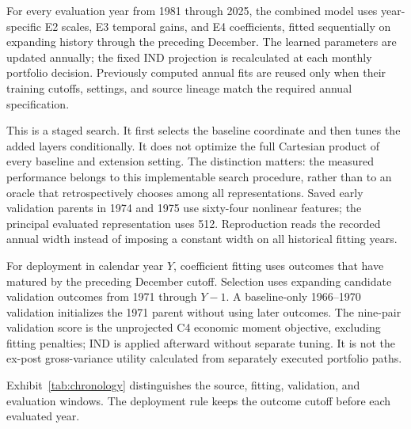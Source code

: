 \documentclass[12pt,letterpaper,fleqn]{article}
\begin{document}
For every evaluation year from 1981 through 2025, the combined model uses year-specific E2 scales, E3 temporal gains, and E4 coefficients, fitted sequentially on expanding history through the preceding December. The learned parameters are updated annually; the fixed IND projection is recalculated at each monthly portfolio decision. Previously computed annual fits are reused only when their training cutoffs, settings, and source lineage match the required annual specification.

This is a staged search. It first selects the baseline coordinate and then tunes the added layers conditionally. It does not optimize the full Cartesian product of every baseline and extension setting. The distinction matters: the measured performance belongs to this implementable search procedure, rather than to an oracle that retrospectively chooses among all representations. Saved early validation parents in 1974 and 1975 use sixty-four nonlinear features; the principal evaluated representation uses 512. Reproduction reads the recorded annual width instead of imposing a constant width on all historical fitting years.

For deployment in calendar year $Y$, coefficient fitting uses outcomes that have matured by the preceding December cutoff. Selection uses expanding candidate validation outcomes from 1971 through $Y-1$. A baseline-only 1966--1970 validation initializes the 1971 parent without using later outcomes. The nine-pair validation score is the unprojected C4 economic moment objective, excluding fitting penalties; IND is applied afterward without separate tuning. It is not the ex-post gross-variance utility calculated from separately executed portfolio paths.

Exhibit~\ref{tab:chronology} distinguishes the source, fitting, validation, and evaluation windows. The deployment rule keeps the outcome cutoff before each evaluated year.
\end{document}
